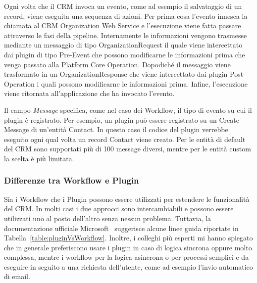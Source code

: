 Ogni volta che il CRM invoca un evento, come ad esempio il salvataggio di un record, viene eseguita una sequenza di azioni.
Per prima cosa l'evento innesca la chiamata al CRM Organization Web Service e l'esecuzione viene fatta passare attraverso le fasi della pipeline. Internamente le informazioni vengono trasmesse mediante un messaggio di tipo OrganizationRequest il quale viene intercettato dai plugin di tipo Pre-Event che possono modificarne le informazioni prima che venga passato alla Platform Core Operation. Dopodiché il messaggio viene trasformato in un OrganizationResponse che viene intercettato dai plugin Post-Operation i quali possono modificarne le informazioni prima.
Infine, l'esecuzione viene ritornata all'applicazione che ha invocato l'evento.

Il campo \textit{Message} specifica, come nel caso dei Workflow, il tipo di evento su cui il plugin è registrato. Per esempio, un plugin può essere registrato su un Create Message di un'entità Contact. In questo caso il codice del plugin verrebbe eseguito ogni qual volta un record Contact viene creato. Per le entità di default del CRM sono supportati più di 100 message diversi, mentre per le entità custom la scelta è più limitata.~\cite{DynamicsTutorialspoint}

\subsubsection{Differenze tra Workflow e Plugin}
Sia i Workflow che i Plugin possono essere utilizzati per estendere le funzionalità del CRM. In molti casi i due approcci sono intercambiabili e possono essere utilizzati uno al posto dell'altro senza nessun problema. 
Tuttavia, la documentazione ufficiale Microsoft~\cite{PluginVSWorkflow} suggerisce alcune linee guida riportate in Tabella~\ref{table:pluginVsWorkflow}. Inoltre, i colleghi più esperti mi hanno spiegato che in generale preferiscono usare i plugin in caso di logica sincrona oppure molto complessa, mentre i workflow per la logica asincrona o per processi semplici e da eseguire in seguito a una richiesta dell'utente, come ad esempio l'invio automatico di email.

